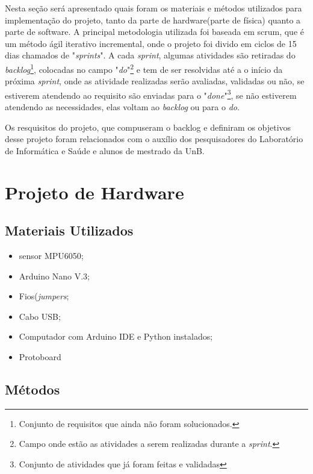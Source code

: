 Nesta seção será apresentado quais foram os materiais e métodos utilizados para implementação do projeto, tanto da parte de hardware(parte de física) quanto a parte de software. A principal metodologia utilizada foi baseada  em scrum, que é um método ágil iterativo incremental, onde o projeto foi divido em ciclos de 15 dias chamados de "\textit{sprints}". A cada \textit{sprint}, algumas atividades são retiradas do \textit{backlog}\footnote{Conjunto de requisitos que ainda não foram solucionados.}, colocadas no campo "\textit{do}"\footnote{Campo onde estão as atividades a serem realizadas durante a \textit{sprint}.}  e tem de ser resolvidas até a o início da próxima \textit{sprint}, onde as atividade realizadas serão avaliadas,  validadas ou não, se estiverem atendendo ao requisito são enviadas para o "\textit{done}"\footnote{Conjunto de atividades que já foram feitas e validadas}, se não estiverem atendendo as necessidades, elas voltam ao \textit{backlog} ou para o \textit{do}.

Os resquisitos do projeto, que compuseram o backlog e definiram os objetivos desse projeto foram relacionados com o auxílio dos pesquisadores do Laboratório de Informática e Saúde e alunos de mestrado da UnB.

\section{Projeto de Hardware}


 
	\subsection{Materiais Utilizados}
		\begin{itemize}
			
			\item sensor MPU6050;
			\item Arduino Nano V.3;
			\item Fios(\textit{jumpers};
			\item Cabo USB;
			\item Computador com Arduino IDE e Python instalados;
			\item Protoboard
			
		\end{itemize}	
	 
	\subsection{Métodos}
		

